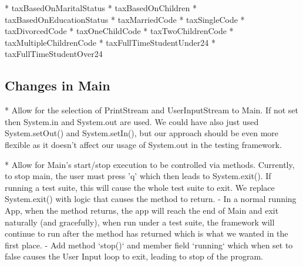 \documentclass[11pt]{article}
\begin{document}
* taxBasedOnMaritalStatus
* taxBasedOnChildren
* taxBasedOnEducationStatus  
* taxMarriedCode
* taxSingleCode
* taxDivorcedCode
* taxOneChildCode
* taxTwoChildrenCode
* taxMultipleChildrenCode
* taxFullTimeStudentUnder24
* taxFullTimeStudentOver24

\subsection{Changes in Main}

* Allow for the selection of PrintStream and UserInputStream to Main. If not set then System.in and System.out are used. 
We could have also just used System.setOut() and System.setIn(), but our approach should be even more flexible as it doesn't affect our usage of System.out in the testing framework. 


* Allow for Main's start/stop execution to be controlled via methods. Currently, to stop main, the user must press 'q' which then leads to System.exit(). If running a test suite, this will cause the whole test suite to exit. We replace System.exit() with logic that causes the method to return. 
 -	In a normal running App,   when the method returns, the app will reach the end of Main and exit naturally (and gracefully), when run under a test suite, the framework will continue to run after the method has returned which is what we wanted in the first place. 
  - Add method `stop()` and member field `running` which when set to false causes the User Input loop to exit, leading to stop of the program.


\end{document}
